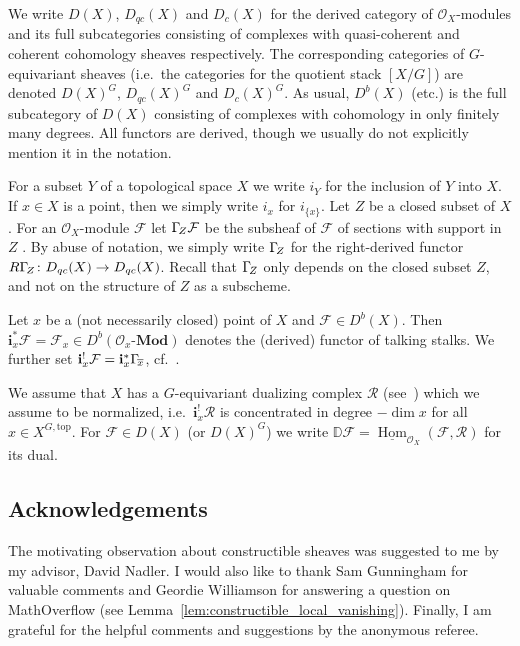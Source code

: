 \documentclass{compositio}
\theoremstyle{plain}
\theoremstyle{definition}
\theoremstyle{remark}
\newcommand\sheaf{\mathcal}
\newcommand\cat{\mathbf}
\newcommand\catModules[1]{#1\text{-}\cat{Mod}}
\newcommand\sheafHom{\underline{\operatorname{Hom}}}
\newcommand\dualize{\mathbb D}
\newcommand\lc[1]{\Gamma_{\mkern-3mu#1}}
\newcommand\Xtop[1][X]{#1^{G,\mathrm{top}}}
\begin{document}
We write $D(X)$, $D_{qc}(X)$ and $D_c(X)$ for the derived category of $\sheaf{O}_X$-modules and its full subcategories consisting of complexes with quasi-coherent and coherent cohomology sheaves respectively.
The corresponding categories of $G$-equivariant sheaves (i.e.\ the categories for the quotient stack $[X/G]$) are denoted $D(X)^G$, $D_{qc}(X)^G$ and $D_c(X)^G$.
As usual, $D^b(X)$ (etc.) is the full subcategory of $D(X)$ consisting of complexes with cohomology in only finitely many degrees.
All functors are derived, though we usually do not explicitly mention it in the notation.

For a subset $Y$ of a topological space $X$ we write $i_Y$ for the inclusion of $Y$ into $X$. 
If $x \in  X$ is a point, then we simply write $i_x$ for $i_{\{x\}}$.
Let $Z$ be a closed subset of $X$.
For an $\sheaf{O}_X$-module $\sheaf F$ let $\lc Z\sheaf F$ be the subsheaf of $\sheaf F$ of sections with support in $Z$ \cite[Variation~3 in IV.1]{Hartshorne:1966:ResiduesAndDuality}.
By abuse of notation, we simply write $\lc Z$ for the right-derived functor $R\lc Z\colon D_{qc}(X) \to  D_{qc}(X)$.
Recall that $\lc Z$ only depends on the closed subset $Z$, and not on the structure of $Z$ as a subscheme.

Let $x$ be a (not necessarily closed) point of $X$ and $\sheaf F \in  D^b(X)$.
Then $\mathbf i_x^*\sheaf F = \sheaf F_x \in  D^b(\catModules{\sheaf{O}_x})$ denotes the (derived) functor of talking stalks.
We further set $\mathbf i_x^!\sheaf F = \mathbf i_x^*\lc {\overline x}$, cf.~\cite[Variation~8 in IV.1]{Hartshorne:1966:ResiduesAndDuality}.

We assume that $X$ has a $G$-equivariant dualizing complex $\sheaf R$ (see~\cite[Definition~1]{Bezrukavnikov:arXiv:PerverseCoherentSheaves}) which we assume to be normalized, i.e.\ $\mathbf i_x^! \sheaf R$ is concentrated in degree $-\dim x$ for all $x \in  \Xtop$.
For $\sheaf F \in  D(X)$ (or $D(X)^G$) we write $\dualize \sheaf F = \sheafHom_{\sheaf{O}_X}(\sheaf F,\sheaf R)$ for its dual.

\subsection{Acknowledgements}

The motivating observation about constructible sheaves was suggested to me by my advisor, David Nadler.
I would also like to thank Sam Gunningham for valuable comments and Geordie Williamson for answering a question on MathOverflow (see Lemma~\ref{lem:constructible_local_vanishing}).
Finally, I am grateful for the helpful comments and suggestions by the anonymous referee.
\end{document}
